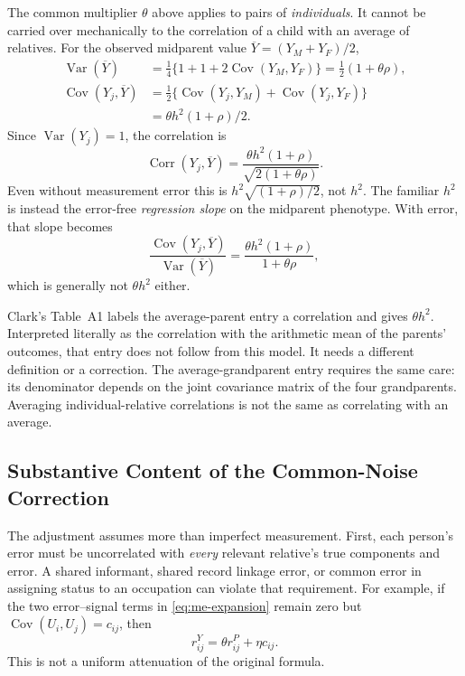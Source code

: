 The common multiplier $\theta$ above applies to pairs of \emph{individuals}.
It cannot be carried over mechanically to the correlation of a child
with an average of relatives. For the observed midparent value
$\overline Y=(Y_M+Y_F)/2$,
\begin{align*}
 \operatorname{Var}(\overline Y)
 &=\tfrac14\{1+1+2\operatorname{Cov}(Y_M,Y_F)\}
   =\tfrac12(1+\theta\rho),\\
 \operatorname{Cov}(Y_j,\overline Y)
 &=\tfrac12\{\operatorname{Cov}(Y_j,Y_M)
             +\operatorname{Cov}(Y_j,Y_F)\}\\
 &=\theta h^2(1+\rho)/2.
\end{align*}
Since $\operatorname{Var}(Y_j)=1$, the correlation is
\begin{equation}
 \boxed{\operatorname{Corr}(Y_j,\overline Y)
 =\frac{\theta h^2(1+\rho)}
        {\sqrt{2(1+\theta\rho)}}.}
 \label{eq:me-midparent}
\end{equation}
Even without measurement error this is
$h^2\sqrt{(1+\rho)/2}$, not $h^2$. The familiar $h^2$ is instead the
error-free \emph{regression slope} on the midparent phenotype.
With error, that slope becomes
\[
 \frac{\operatorname{Cov}(Y_j,\overline Y)}
      {\operatorname{Var}(\overline Y)}
 =\frac{\theta h^2(1+\rho)}{1+\theta\rho},
\]
which is generally not $\theta h^2$ either.

Clark's Table~A1 labels the average-parent entry a correlation and gives
$\theta h^2$. Interpreted literally as the correlation with the arithmetic
mean of the parents' outcomes, that entry does not follow from this model.
It needs a different definition or a correction. The average-grandparent
entry requires the same care: its denominator depends on the joint
covariance matrix of the four grandparents. Averaging individual-relative
correlations is not the same as correlating with an average.

\subsection{Substantive Content of the Common-Noise Correction}
\label{sec:me-meaning}

The adjustment assumes more than imperfect measurement. First, each
person's error must be uncorrelated with \emph{every} relevant relative's
true components and error. A shared informant, shared record linkage
error, or common error in assigning status to an occupation can violate
that requirement. For example, if the two error--signal terms in
\eqref{eq:me-expansion} remain zero but
$\operatorname{Cov}(U_i,U_j)=c_{ij}$, then
\[
 r^Y_{ij}=\theta r^P_{ij}+\eta c_{ij}.
\]
This is not a uniform attenuation of the original formula.

